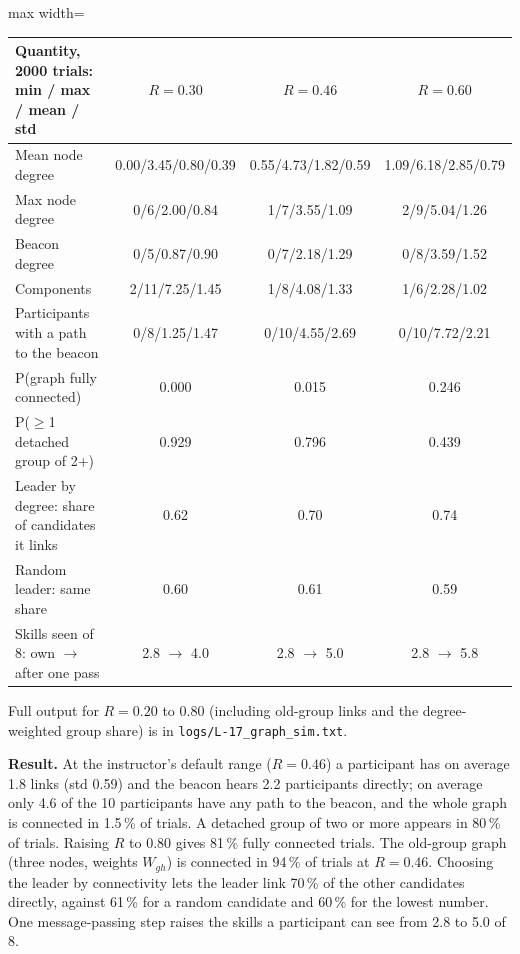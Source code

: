\IfFileExists{IEEEtran.cls}{\documentclass[conference]{IEEEtran}}{\documentclass[10pt,twocolumn]{article}}
\newcommand{\fitcol}[1]{\begin{adjustbox}{max width=\columnwidth}#1\end{adjustbox}}
\begin{document}
\begin{center}\footnotesize\setlength{\tabcolsep}{3pt}
\fitcol{\begin{tabular}{@{}l ccc@{}}
\toprule
Quantity, 2000 trials: min / max / mean / std & $R=0.30$ & $R=0.46$ & $R=0.60$\\
\midrule
Mean node degree & 0.00/3.45/0.80/0.39 & 0.55/4.73/1.82/0.59 & 1.09/6.18/2.85/0.79\\
Max node degree & 0/6/2.00/0.84 & 1/7/3.55/1.09 & 2/9/5.04/1.26\\
Beacon degree & 0/5/0.87/0.90 & 0/7/2.18/1.29 & 0/8/3.59/1.52\\
Components & 2/11/7.25/1.45 & 1/8/4.08/1.33 & 1/6/2.28/1.02\\
Participants with a path to the beacon & 0/8/1.25/1.47 & 0/10/4.55/2.69 & 0/10/7.72/2.21\\
P(graph fully connected) & 0.000 & 0.015 & 0.246\\
P($\ge$1 detached group of 2+) & 0.929 & 0.796 & 0.439\\
Leader by degree: share of candidates it links & 0.62 & 0.70 & 0.74\\
Random leader: same share & 0.60 & 0.61 & 0.59\\
Skills seen of 8: own $\to$ after one pass & 2.8 $\to$ 4.0 & 2.8 $\to$ 5.0 & 2.8 $\to$ 5.8\\
\bottomrule
\end{tabular}}
\end{center}
Full output for $R=0.20$ to $0.80$ (including old-group links and the degree-weighted group share) is in \texttt{logs/L-17\_graph\_sim.txt}.

\textbf{Result.} At the instructor's default range ($R=0.46$) a participant has on average 1.8 links (std 0.59) and the beacon hears 2.2 participants directly; on average only 4.6 of the 10 participants have any path to the beacon, and the whole graph is connected in 1.5\,\% of trials. A detached group of two or more appears in 80\,\% of trials. Raising $R$ to 0.80 gives 81\,\% fully connected trials. The old-group graph (three nodes, weights $W_{gh}$) is connected in 94\,\% of trials at $R=0.46$. Choosing the leader by connectivity lets the leader link 70\,\% of the other candidates directly, against 61\,\% for a random candidate and 60\,\% for the lowest number. One message-passing step raises the skills a participant can see from 2.8 to 5.0 of 8.
\end{document}
